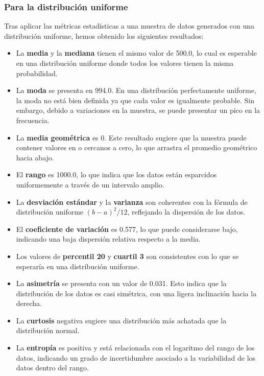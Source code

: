 \documentclass[11pt]{article} %
\begin{document}
	\subsubsection{Para la distribución uniforme}
	Tras aplicar las métricas estadísticas a una muestra de datos generados con una distribución uniforme, hemos obtenido los siguientes resultados:
	
	\begin{itemize}
		\item La \textbf{media} y la \textbf{mediana} tienen el mismo valor de 500.0, lo cual es esperable en una distribución uniforme donde todos los valores tienen la misma probabilidad.
		\item La \textbf{moda} se presenta en 994.0. En una distribución perfectamente uniforme, la moda no está bien definida ya que cada valor es igualmente probable. Sin embargo, debido a variaciones en la muestra, se puede presentar un pico en la frecuencia.
		\item La \textbf{media geométrica} es 0. Este resultado sugiere que la muestra puede contener valores en o cercanos a cero, lo que arrastra el promedio geométrico hacia abajo.
		\item El \textbf{rango} es 1000.0, lo que indica que los datos están esparcidos uniformemente a través de un intervalo amplio.
		\item La \textbf{desviación estándar} y la \textbf{varianza} son coherentes con la fórmula de distribución uniforme $(b-a)^2/12$, reflejando la dispersión de los datos.
		\item El \textbf{coeficiente de variación} es 0.577, lo que puede considerarse bajo, indicando una baja dispersión relativa respecto a la media.
		\item Los valores de \textbf{percentil 20} y \textbf{cuartil 3} son consistentes con lo que se esperaría en una distribución uniforme.
		\item La \textbf{asimetría} se presenta con un valor de 0.031. Esto indica que la distribución de los datos es casi simétrica, con una ligera inclinación hacia la derecha. 
		\item La \textbf{curtosis} negativa sugiere una distribución más achatada que la distribución normal.
		\item La \textbf{entropía} es positiva y está relacionada con el logaritmo del rango de los datos, indicando un grado de incertidumbre asociado a la variabilidad de los datos dentro del rango.
	\end{itemize}
	
\end{document}
